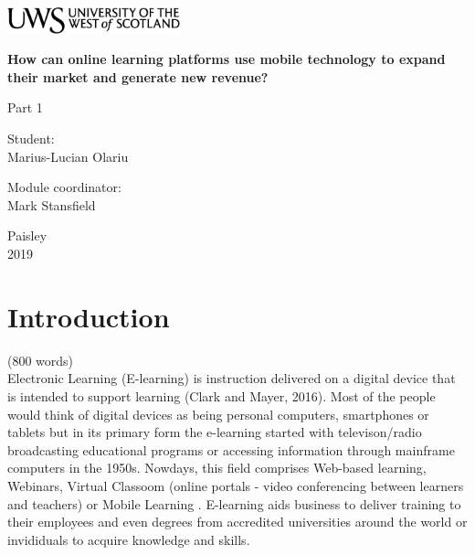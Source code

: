 \documentclass[11]{article}
\begin{document}
\begin{titlepage}
	\begin{center}	
		\includegraphics[width = 5cm,height = 1.5cm]{uws_logo.png}\\[5cm]
	
{ \huge \bfseries %
		How can online learning platforms use mobile technology to expand their market and generate new revenue?\\ \Large 
}
	\vspace{2cm}
	
	{\huge
		Part 1 
	}

	\vspace{2cm}			
			
		\begin{flushright}
				\large Student:\\
				Marius-Lucian Olariu\\[1cm]
		\end{flushright}
		
	
		\begin{flushleft}
			 \large
				Module coordinator: \\
				Mark Stansfield \\[1cm]
		\end{flushleft}
		
	\vspace{2cm}	
	
		
		\vfill
		
		{\large {Paisley \\ 2019}}
		\end{center}
\end{titlepage}

\newpage

\tableofcontents

\listoffigures

\listoftables

\newpage
\section{Introduction}(800 words)\\

		Electronic Learning (E-learning) is instruction delivered on a digital device that is intended to support learning (Clark and Mayer, 2016). Most of the people would think of digital devices as being personal computers, smartphones or tablets but  in its primary form the e-learning started with televison/radio broadcasting  educational programs or accessing information through mainframe computers in the 1950s. Nowdays, this field comprises Web-based learning, Webinars, Virtual Classoom (online portals - video conferencing between learners and teachers) or Mobile Learning . E-learning  aids business to deliver training to their employees and even degrees from accredited universities around the world or invididuals to acquire knowledge and skills.\\
\end{document}
